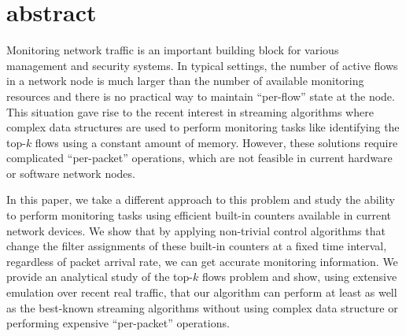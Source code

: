 \section{abstract}

Monitoring network traffic is an important building block for various management and security systems. In typical settings, the number of active flows in a network node is much larger than the number of available monitoring resources and there is no practical way to maintain “per-flow” state at the node. This situation gave rise to the recent interest in streaming algorithms where complex data structures are used to perform monitoring tasks like identifying the top-$k$ flows using a constant amount of memory.  However, these solutions require complicated “per-packet” operations, which are not feasible in current hardware or software network nodes.

In this paper, we take a different approach to this problem and study the ability to perform monitoring tasks using efficient built-in counters available in current network devices. We show that by applying non-trivial control algorithms that change the filter assignments of these built-in counters at a fixed time interval, regardless of packet arrival rate, we can get accurate monitoring information. We provide an analytical study of the top-$k$ flows problem and show, using extensive emulation over recent real traffic, that our algorithm can perform at least as well as the best-known streaming algorithms without using complex data structure or performing expensive “per-packet” operations.